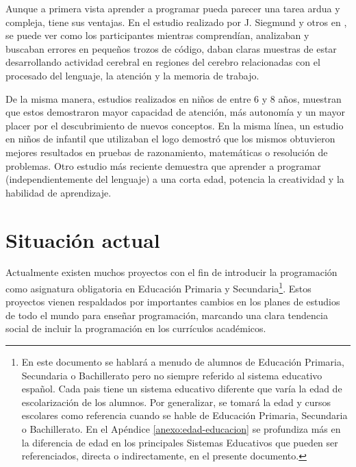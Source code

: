 Aunque a primera vista aprender a programar pueda parecer una tarea ardua y compleja, tiene sus ventajas. En el estudio realizado por J. Siegmund y otros en \cite{siegmund2014understanding}, se puede ver como los participantes mientras comprendían, analizaban y buscaban errores en pequeños trozos de código, daban claras muestras de estar desarrollando actividad cerebral en regiones del cerebro relacionadas con el procesado del lenguaje, la atención y la memoria de trabajo.

De la misma manera, estudios realizados en niños \cite{clements1986effects} de entre 6 y 8 años, muestran que estos demostraron mayor capacidad de atención, más autonomía y un mayor placer por el descubrimiento de nuevos conceptos. En la misma línea, un estudio en niños de infantil \cite{logo-geometry} que utilizaban el \Gls{logo} demostró que los mismos obtuvieron mejores resultados en pruebas de razonamiento, matemáticas o resolución de problemas. Otro estudio más reciente \cite{liao1991effects} demuestra que aprender a programar (independientemente del lenguaje) a una corta edad, potencia la creatividad y la habilidad de aprendizaje.



\section{Situación actual}
\label{sec:situacion-actual}


Actualmente existen muchos proyectos con el fin de introducir la programación como asignatura obligatoria en Educación Primaria y Secundaria\footnote{En este documento se hablará a menudo de alumnos de Educación Primaria, Secundaria o Bachillerato pero no siempre referido al sistema educativo español. Cada pais tiene un sistema educativo diferente que varía la edad de escolarización de los alumnos. Por generalizar, se tomará la edad y cursos escolares como referencia cuando se hable de Educación Primaria, Secundaria o Bachillerato. En el Apéndice \ref{anexo:edad-educacion} se profundiza más en la diferencia de edad en los principales Sistemas Educativos que pueden ser referenciados, directa o indirectamente, en el presente documento.}. Estos proyectos vienen respaldados por importantes cambios en los planes de estudios de todo el mundo para enseñar programación\cite{cs-education,madrid-programacion,codigo21, guide-england-computing,chicago-cs}, marcando una clara tendencia social de incluir la programación en los currículos académicos.


